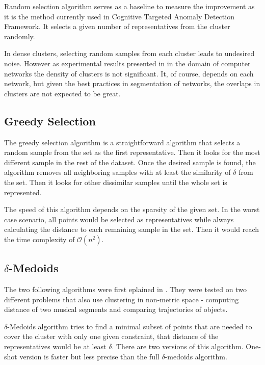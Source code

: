 \documentclass[thesis=B,english]{FITthesis}[2012/10/20]
\begin{document}
Random selection algorithm serves as a baseline to measure the improvement as it is the method currently used in Cognitive Targeted Anomaly Detection Framework.
It selects a given number of representatives from the cluster randomly.

In dense clusters, selecting random samples from each cluster leads to undesired noise.
However as experimental results presented in \cite{kopp2018community} in the domain of computer networks the density of clusters is not significant.
It, of course, depends on each network, but given the best practices in segmentation of networks, the overlaps in clusters are not expected to be great.

\subsection{Greedy Selection}\label{subsec:greedy_select}
The greedy selection algorithm is a straightforward algorithm that selects a random sample from the set as the first representative.
Then it looks for the most different sample in the rest of the dataset.
Once the desired sample is found, the algorithm removes all neighboring samples with at least the similarity of $\delta$ from the set.
Then it looks for other dissimilar samples until the whole set is represented.

The speed of this algorithm depends on the sparsity of the given set.
In the worst case scenario, all points would be selected as representatives while always calculating the distance to each remaining sample in the set. Then it would reach the time complexity of $\mathcal{O}(n^2)$.

\subsection{$\delta$-Medoids}\label{subsec:delta_medoids}
The two following algorithms were first eplained in \cite{liebman2015representative}.
They were tested on two different problems that also use clustering in non-metric space - computing distance of two musical segments and comparing trajectories of objects.

$\delta$-Medoids algorithm tries to find a minimal subset of points that are needed to cover the cluster with only one given constraint, that distance of the representatives would be at least $\delta$.
There are two versions of this algorithm.
One-shot version is faster but less precise than the full $\delta$-medoids algorithm.
\end{document}
